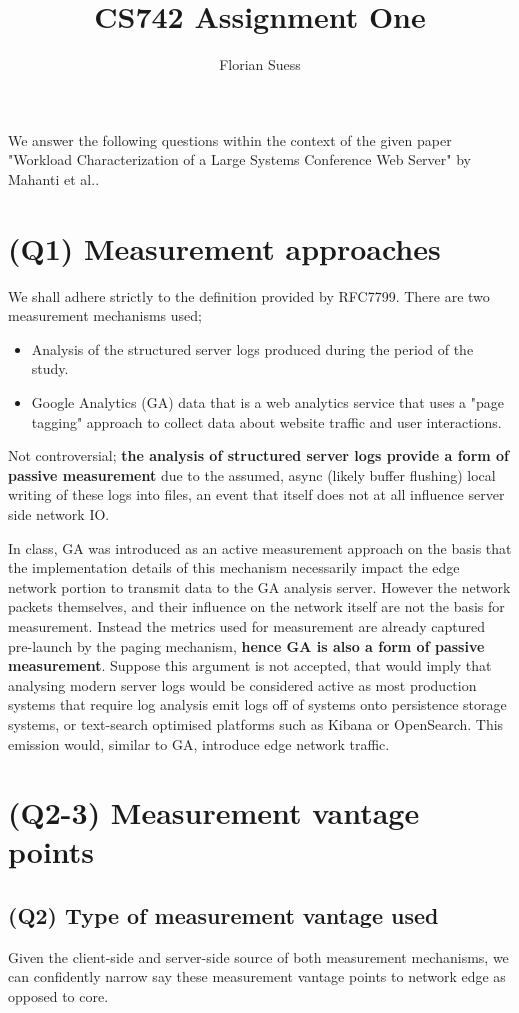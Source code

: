 \documentclass{article}
\date{\displaydate{date}}
\title{CS742 Assignment One}
\author{Florian Suess}
\begin{document}
\maketitle
We answer the following questions within the context of the given paper "Workload Characterization of a Large Systems Conference Web Server" by Mahanti et al.\cite{mahanti2009}.
\section*{(Q1) Measurement approaches}
We shall adhere strictly to the definition provided by RFC7799\cite{rfc7799}. There are two measurement mechanisms used;

\begin{itemize}
				\item Analysis of the structured server logs produced during the period of the study.
				\item Google Analytics (GA) data that is a web analytics service that uses a "page tagging" approach to collect data about website traffic and user interactions.
\end{itemize}

Not controversial; \textbf{the analysis of structured server logs provide a form of passive measurement} due to the assumed, async (likely buffer flushing) local writing of these logs into files, an event that itself does not at all influence server side network IO.

In class, GA was introduced as an active measurement approach on the basis that the implementation details of this mechanism necessarily impact the edge network portion to transmit data to the GA analysis server. However the network packets themselves, and their influence on the network itself are not the basis for measurement. Instead the metrics used for measurement are already captured pre-launch by the paging mechanism, \textbf{hence GA is also a form of passive measurement}. Suppose this argument is not accepted, that would imply that analysing modern server logs would be considered active as most production systems that require log analysis emit logs off of systems onto persistence storage systems, or text-search optimised platforms such as Kibana or OpenSearch. This emission would, similar to GA, introduce edge network traffic.

\section*{(Q2-3) Measurement vantage points}
\subsection*{(Q2) Type of measurement vantage used}
Given the client-side and server-side source of both measurement mechanisms, we can confidently narrow say these measurement vantage points to network edge as opposed to core.
\end{document}
